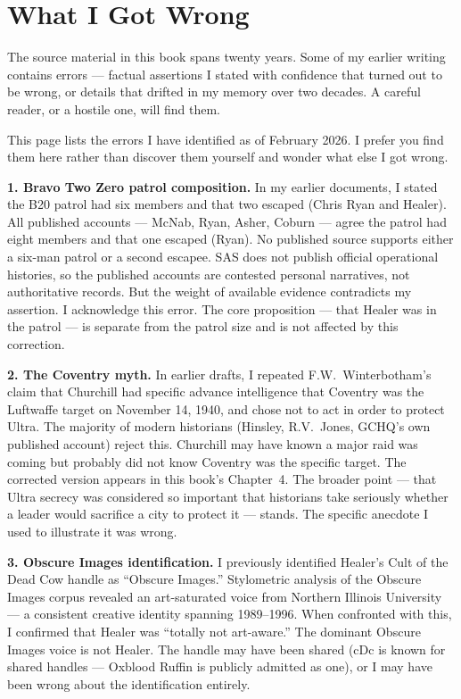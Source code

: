 \chapter*{What I Got Wrong}

The source material in this book spans twenty years. Some of my earlier writing contains errors --- factual assertions I stated with confidence that turned out to be wrong, or details that drifted in my memory over two decades. A careful reader, or a hostile one, will find them.

This page lists the errors I have identified as of February 2026. I prefer you find them here rather than discover them yourself and wonder what else I got wrong.

\textbf{1. Bravo Two Zero patrol composition.} In my earlier documents, I stated the B20 patrol had six members and that two escaped (Chris Ryan and Healer). All published accounts --- McNab, Ryan, Asher, Coburn --- agree the patrol had eight members and that one escaped (Ryan). No published source supports either a six-man patrol or a second escapee. SAS does not publish official operational histories, so the published accounts are contested personal narratives, not authoritative records. But the weight of available evidence contradicts my assertion. I acknowledge this error. The core proposition --- that Healer was in the patrol --- is separate from the patrol size and is not affected by this correction.

\textbf{2. The Coventry myth.} In earlier drafts, I repeated F.W.\ Winterbotham's claim that Churchill had specific advance intelligence that Coventry was the Luftwaffe target on November 14, 1940, and chose not to act in order to protect Ultra. The majority of modern historians (Hinsley, R.V.\ Jones, GCHQ's own published account) reject this. Churchill may have known a major raid was coming but probably did not know Coventry was the specific target. The corrected version appears in this book's Chapter~4. The broader point --- that Ultra secrecy was considered so important that historians take seriously whether a leader would sacrifice a city to protect it --- stands. The specific anecdote I used to illustrate it was wrong.

\textbf{3. Obscure Images identification.} I previously identified Healer's Cult of the Dead Cow handle as ``Obscure Images.'' Stylometric analysis of the Obscure Images corpus revealed an art-saturated voice from Northern Illinois University --- a consistent creative identity spanning 1989--1996. When confronted with this, I confirmed that Healer was ``totally not art-aware.'' The dominant Obscure Images voice is not Healer. The handle may have been shared (cDc is known for shared handles --- Oxblood Ruffin is publicly admitted as one), or I may have been wrong about the identification entirely.

